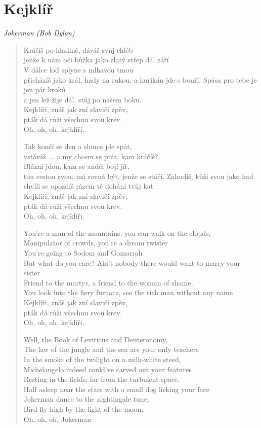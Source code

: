 \section*{Kejklíř}

\textit{Jokerman (Bob Dylan)}

\begin{verse}
Kráčíš po hladině, dáváš svůj chléb\\
jenže k nám oči bůžka jako zlatý střep dál září\\ 
V dálce loď splyne s mlhavou tmou\\
přicházíš jako král, hady na rukou, a hurikán jde s bouří. 
Spása pro tebe je jen pár kroků\\
a jen lež žije dál, stůj po našem boku. \\
Kejklíři, znáš jak zní slavičí zpěv,\\
pták dá růži všechnu svou krev. \\
Oh, oh, oh, kejklíři.

Tak končí se den a slunce jde spát, \\
vstáváš ... a my chcem se ptát, kam kráčíš? \\
Blázni jdou, kam se anděl bojí jít, \\
tou cestou svou, má rovná být, jenže se stáčí.
Zahodíš, kůži svou jako had \\
chvíli se opozdíš rázem tě dohání tvůj kat \\
Kejklíři, znáš jak zní slavičí zpěv,\\
pták dá růži všechnu svou krev. \\
Oh, oh, oh, kejklíři.

You're a man of the mountains, you can walk on the clouds, \\
Manipulator of crowds, you're a dream twister \\
You're going to Sodom and Gomorrah \\
But what do you care? Ain't nobody there would want to marry your sister \\
Friend to the martyr, a friend to the woman of shame, \\
You look into the fiery furnace, see the rich man without any name \\
Kejklíři, znáš jak zní slavičí zpěv,\\
pták dá růži všechnu svou krev. \\
Oh, oh, oh, kejklíři.

Well, the Book of Leviticus and Deuteronomy, \\
The law of the jungle and the sea are your only teachers \\
In the smoke of the twilight on a milk-white steed, \\
Michelangelo indeed could've carved out your features \\
Resting in the fields, far from the turbulent space, \\
Half asleep near the stars with a small dog licking your face \\
Jokerman dance to the nightingale tune, \\
Bird fly high by the light of the moon, \\
Oh, oh, oh, Jokerman


\end{verse}
